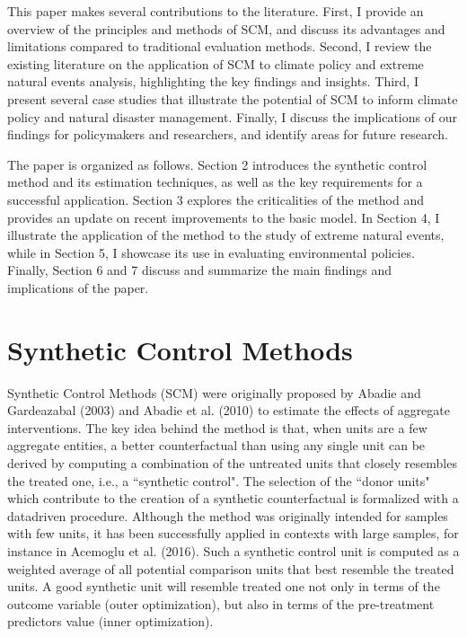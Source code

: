\documentclass[12pt,a4paper,draft]{article}
\begin{document}
This paper makes several contributions to the literature. First, I provide an 
overview of the principles and methods of SCM, and discuss its advantages and 
limitations compared to traditional evaluation methods. Second, I review the 
existing literature on the application of SCM to climate policy and extreme 
natural events analysis, highlighting the key findings and insights. Third, 
I present several case studies that illustrate the potential of SCM to inform 
climate policy and natural disaster management. Finally, I discuss the implications 
of our findings for policymakers and researchers, and identify areas for future research.

The paper is organized as follows. 
Section 2 introduces the synthetic control method and its estimation techniques, as 
well as the key requirements for a successful application. 
Section 3 explores the criticalities of the method and provides an update on recent 
improvements to the basic model. 
In Section 4, I illustrate the application of the method to the study of extreme 
natural events, while in Section 5, I showcase its use in evaluating environmental 
policies. 
Finally, Section 6 and 7 discuss and summarize the main findings and implications 
of the paper.



\section{Synthetic Control Methods}  %

Synthetic Control Methods (SCM) were originally proposed by Abadie and Gardeazabal 
(2003) and Abadie et al. (2010) to estimate the effects of aggregate interventions.
The key idea behind the method is that, when units are a few aggregate entities, 
a better counterfactual than using any single unit can be derived by computing a 
combination of the untreated units that closely resembles the treated one, i.e., 
a ``synthetic control". 
The selection of the ``donor units" which contribute to the creation of a synthetic 
counterfactual is formalized with a datadriven procedure.
Although the method was originally intended for samples with few units, it has been 
successfully applied in contexts with large samples, for instance in Acemoglu et 
al. (2016).
Such a synthetic control unit is computed as a weighted average of all potential 
comparison units that best resemble the treated units. A good synthetic unit will 
resemble treated one not only in terms of the outcome variable (outer optimization), 
but also in terms of the pre-treatment predictors value (inner optimization).
\end{document}
